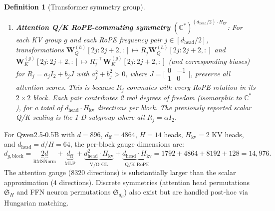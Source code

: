 \documentclass{article}
\newtheorem{definition}[theorem]{Definition}
\newcommand{\bW}{\mathbf{W}}
\begin{document}
\begin{definition}[Transformer symmetry group]
\begin{enumerate}
 \item \textbf{Attention Q/K RoPE-commuting symmetry} $(\mathbb{C}^*)^{(d_\text{head}/2) \cdot H_{\text{kv}}}$: For each KV group $g$ and each RoPE frequency pair $j \in [d_\text{head}/2]$, transformations $\bW_Q^{(h)}[2j{:}2j{+}2,:] \mapsto R_j \bW_Q^{(h)}[2j{:}2j{+}2,:]$ and $\bW_K^{(g)}[2j{:}2j{+}2,:] \mapsto R_j^{-\top}\bW_K^{(g)}[2j{:}2j{+}2,:]$ (and corresponding biases) for $R_j = a_j I_2 + b_j J$ with $a_j^2 + b_j^2 > 0$, where $J = \bigl[\begin{smallmatrix}0 & -1\\1 & 0\end{smallmatrix}\bigr]$, preserve all attention scores. This is because $R_j$ commutes with every RoPE rotation in its $2 \times 2$ block. Each pair contributes 2 real degrees of freedom (isomorphic to $\mathbb{C}^*$), for a total of $d_\text{head} \cdot H_{\text{kv}}$ directions per block. The previously reported scalar Q/K scaling is the 1-D subgroup where all $R_j = \alpha I_2$.
\end{enumerate}
\end{definition}

For Qwen2.5-0.5B with $d = 896$, $d_\text{ff} = 4864$, $H=14$ heads, $H_{\text{kv}}=2$ KV heads, and $d_\text{head} = d/H = 64$, the per-block gauge dimensions are:
\begin{equation}\label{eq:gauge-count}
 d_{g,\text{block}} = \underbrace{2d}_{\text{RMSNorm}} + \underbrace{d_\text{ff}}_{\text{MLP}} + \underbrace{d_\text{head}^2 \cdot H_{\text{kv}}}_{\text{V/O GL}} + \underbrace{d_\text{head} \cdot H_{\text{kv}}}_{\text{Q/K RoPE}} = 1792 + 4864 + 8192 + 128 = 14{,}976.
\end{equation}
The attention gauge ($8320$ directions) is substantially larger than the scalar approximation ($4$ directions). Discrete symmetries (attention head permutations $\mathfrak{S}_H$ and FFN neuron permutations $\mathfrak{S}_{d_\text{ff}}$) also exist but are handled post-hoc via Hungarian matching.
\end{document}
